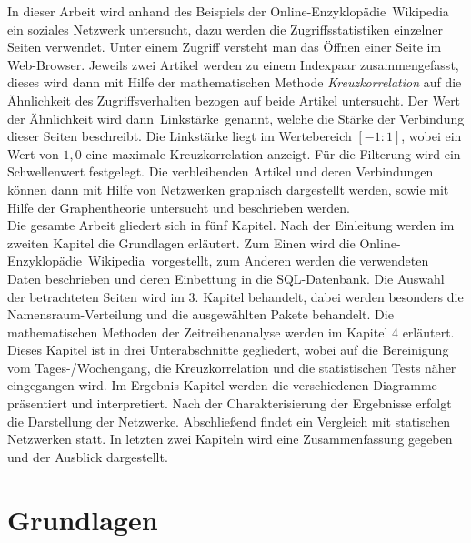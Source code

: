 \documentclass[fontsize=11pt, twoside, a4paper]{scrartcl}
\begin{document}
In dieser Arbeit wird anhand des Beispiels der Online-Enzyklopädie \,\glqq Wikipedia\grqq \, ein soziales Netzwerk untersucht, dazu werden die Zugriffsstatistiken einzelner Seiten verwendet. Unter einem Zugriff versteht man das Öffnen einer Seite im Web-Browser. Jeweils zwei Artikel werden zu einem Indexpaar zusammengefasst, dieses wird dann mit Hilfe der mathematischen Methode \textit{Kreuzkorrelation} auf die Ähnlichkeit des Zugriffsverhalten bezogen auf beide Artikel untersucht. Der Wert der Ähnlichkeit wird dann \,\glqq Linkstärke\grqq\, genannt, welche die Stärke der Verbindung dieser Seiten beschreibt. Die Linkstärke liegt im Wertebereich $[-1:1]$, wobei ein Wert von $1,0$ eine maximale Kreuzkorrelation anzeigt. Für die Filterung wird ein Schwellenwert festgelegt. Die verbleibenden Artikel und deren Verbindungen können dann mit Hilfe von Netzwerken graphisch dargestellt werden, sowie mit Hilfe der Graphentheorie untersucht und beschrieben werden.\\
Die gesamte Arbeit gliedert sich in fünf Kapitel. Nach der Einleitung werden im zweiten Kapitel die Grundlagen erläutert. Zum Einen wird die Online-Enzyklopädie \,\glqq Wikipedia\grqq\, vorgestellt, zum Anderen werden die verwendeten Daten beschrieben und deren Einbettung in die SQL-Datenbank. Die Auswahl der betrachteten Seiten wird im 3. Kapitel behandelt, dabei werden besonders die Namensraum-Verteilung und die ausgewählten Pakete behandelt. Die mathematischen Methoden der Zeitreihenanalyse werden im Kapitel 4 erläutert. Dieses Kapitel ist in drei Unterabschnitte gegliedert, wobei auf die Bereinigung vom Tages-/Wochengang, die Kreuzkorrelation und die statistischen Tests näher eingegangen wird. Im Ergebnis-Kapitel werden die verschiedenen Diagramme präsentiert und interpretiert. Nach der Charakterisierung der Ergebnisse erfolgt die Darstellung der Netzwerke. Abschließend findet ein Vergleich mit statischen Netzwerken statt. In letzten zwei Kapiteln wird eine Zusammenfassung gegeben und der Ausblick dargestellt.

\section{Grundlagen}
\end{document}
